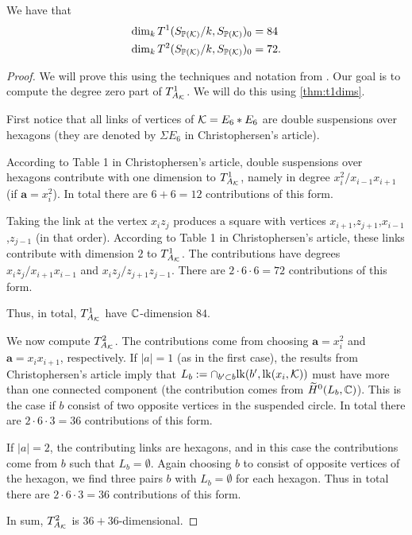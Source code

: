 \begin{proposition}
We have that
\begin{align*}
\dim_k T^1(S_{\mathbb{P}(\mathcal{K})}/k,S_{\mathbb{P}(\mathcal{K})})_0 &= 84 \\
\dim_k T^2(S_{\mathbb{P}(\mathcal{K})}/k,S_{\mathbb{P}(\mathcal{K})})_0 &= 72. \\
\end{align*}
\end{proposition}
\begin{proof}
We will prove this using the techniques and notation from \cite{deforming_christophersen}. Our goal is to compute the degree zero part of $T^1_{A_{\mathcal{K}}}$. We will do this using \cref{thm:t1dims}.

First notice that all links of vertices of $\mathcal{K}=E_6 \ast E_6$ are double suspensions over hexagons (they are denoted by $\Sigma E_6$ in Christophersen's article). 

According to Table 1 in Christophersen's article, double suspensions over hexagons contribute with one dimension to $T^1_{A_{\mathcal{K}}}$, namely in degree $x_i^2/x_{i-1}x_{i+1}$ (if $\mathbf a =x_i^2$). In total there are $6+6=12$ contributions of this form.

Taking the link at the vertex $x_iz_j$ produces a square with vertices $x_{i+1}$,$z_{j+1}$,$x_{i-1}$,$z_{j-1}$ (in that order). According to Table 1 in Christophersen's article, these links contribute with dimension $2$ to $T^1_{A_{\mathcal{K}}}$. The contributions have degrees $x_iz_j/x_{i+1}x_{i-1}$ and $x_iz_j/z_{j+1}z_{j-1}$. There are $2 \cdot 6 \cdot 6=72$ contributions of this form.

Thus, in total, $T^1_{A_{\mathcal{K}}}$ have $\mathbb{C}$-dimension $84$.

We now compute $T^2_{A_{\mathcal{K}}}$. The contributions come from choosing $\mathbf a=x_i^2$ and $\mathbf a=x_ix_{i+1}$, respectively. If $|a|=1$ (as in the first case), the results from Christophersen's article imply that $L_b := \cap_{b' \subset b} \mathrm{lk}(b',\mathrm{lk}(x_i,\mathcal{K}))$ must have more than one connected component (the contribution comes from $\widetilde H^0(L_b,\mathbb{C})$). This is the case if $b$ consist of two opposite vertices in the suspended circle. In total there are $2 \cdot 6 \cdot 3=36$ contributions of this form. 

If $|a|=2$, the contributing links are hexagons, and in this case the contributions come from $b$ such that $L_b=\emptyset$. Again choosing $b$ to consist of opposite vertices of the hexagon, we find three pairs $b$ with $L_b=\emptyset$ for each hexagon. Thus in total there are $2 \cdot 6 \cdot 3=36$ contributions of this form.

In sum, $T^2_{A_{\mathcal{K}}}$ is $36+36$-dimensional.
\end{proof}

